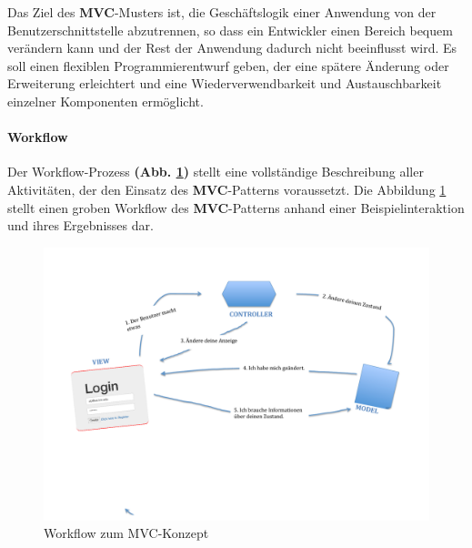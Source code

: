 Das Ziel des \textbf{MVC}-Musters ist, die Geschäftslogik einer Anwendung von der Benutzerschnittstelle abzutrennen, so dass ein Entwickler einen Bereich bequem verändern kann und der Rest der Anwendung dadurch nicht beeinflusst wird. Es soll einen flexiblen Programmierentwurf geben, der eine spätere Änderung oder Erweiterung erleichtert und eine Wiederverwendbarkeit und Austauschbarkeit einzelner Komponenten ermöglicht.

\paragraph{Workflow}

Der Workflow-Prozess \textbf{(Abb. \ref{img:mvc})} stellt eine vollständige Beschreibung aller Aktivitäten, der den Einsatz des \textbf{MVC}-Patterns voraussetzt. Die Abbildung \ref{img:mvc} stellt einen groben Workflow des \textbf{MVC}-Patterns anhand einer Beispielinteraktion und ihres Ergebnisses dar.
\begin{figure}[H]
\centering
\includegraphics[trim = 0mm 60mm 0mm 20mm, clip, width=1.0\textwidth]{resources/mvc}
\caption[Workflow zum MVC-Konzept]{Workflow zum MVC-Konzept}
\label{img:mvc}
\end{figure}

